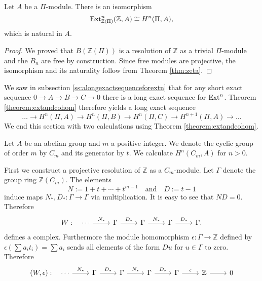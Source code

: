 \begin{theorem}\cite[Corollary IV.5.2.]{maclane}
\label{theorem:extandcohom}
Let $A$ be a $\Pi$-module.
There is an isomorphism
\[\operatorname{Ext}^{n}_{\mathbb{Z}(\Pi)}(\mathbb{Z},A)\cong H^{n}(\Pi,A),\]
which is natural in $A$.
\end{theorem}
\begin{proof}
We proved that $B(\mathbb{Z}(\Pi))$ is a resolution of $\mathbb{Z}$ as a trivial $\Pi$-module and the $B_n$ are free by construction.
Since free modules are projective, the isomorphism and its naturality follow from Theorem \ref{thm:zeta}.
\end{proof}
We saw in subsection \ref{ss:alongexactsequenceforextn} that for any short exact sequence $0 \to A \to B \to C \to 0$ there is a long exact sequence for $\operatorname{Ext}^{n}$.
Theorem \ref{theorem:extandcohom} therefore yields a long exact sequence
\begin{equation*}
\dots \to H^n(\Pi, A) \to H^n(\Pi, B) \to H^n(\Pi, C) \to H^{n
+1}(\Pi,A) \to \dots
\end{equation*}
We end this section with two calculations using Theorem \ref{theorem:extandcohom}.
\begin{application}\cite[Chapter IV.7.]{maclane}
\label{app}
Let $A$ be an abelian group and $m$ a positive integer.
We denote the cyclic group of order $m$ by $C_m$ and its generator by $t$.
We calculate $H^n(C_m, A)$ for $n>0$.
\end{application}
First we construct a projective resolution of $\mathbb{Z}$ as a $C_m$-module.
Let $\Gamma$ denote the group ring $\mathbb{Z}(C_m)$.
The elements
\[
N := 1 + t + \cdots + t^{m-1}\quad \text{and} \quad D := t - 1
\]
induce maps $N_*, D_*: \Gamma \to \Gamma$ via multiplication.
It is easy to see that $ND = 0$.
Therefore
\[
\begin{tikzcd}
W : \quad \cdots \arrow{r}{N_*} & \Gamma \arrow{r}{D_*} & \Gamma \arrow{r}{N_*} & \Gamma \arrow{r}{D_*} & \Gamma .
\end{tikzcd}
\]
defines a complex.
Furthermore the module homomorphism $\epsilon: \Gamma \to \mathbb{Z}$ defined by $\epsilon \left( \sum a_i t_i \right) =\sum a_i$ sends all elements of the form $Du$ for $u\in \Gamma$ to zero.
Therefore
\begin{equation*}
\begin{tikzcd}
(W,\epsilon): \quad \cdots \arrow{r}{N_*} & \Gamma \arrow{r}{D_*} & \Gamma \arrow{r}{N_*} & \Gamma \arrow{r}{D_*} & \Gamma \arrow{r}{\epsilon}& \mathbb{Z} \arrow{r}& 0
\end{tikzcd}
\end{equation*}
